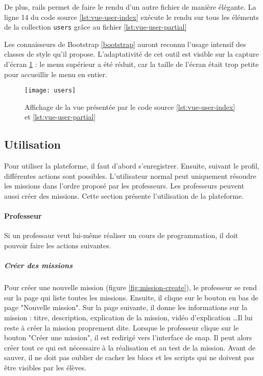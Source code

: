 \begin{figure}

\end{figure}
De plus, \gls{rails} permet de faire le rendu d'un autre fichier de manière élégante. La ligne 14 du code source \ref{lst:vue-user-index} exécute le rendu sur tous les éléments de la collection \texttt{users} grâce au fichier \ref{lst:vue-user-partial}

Les connaisseurs de Bootstrap \ref{bootstrap} auront reconnu l'usage intensif des classes de style qu'il propose. L'adaptativité de cet outil est visible sur la capture d'écran \ref{fig:vue-users} : le menu supérieur a été réduit, car la taille de l'écran était trop petite pour accueillir le menu en entier.

\begin{figure}
  \begin{center}
    \texttt{[image: users]}
    \caption{Affichage de la vue présentée par le code source \ref{lst:vue-user-index} et \ref{lst:vue-user-partial}}
    \label{fig:vue-users}
  \end{center}
\end{figure}

\subsection{Utilisation}
Pour utiliser la plateforme, il faut d'abord s'enregistrer. Ensuite, suivant le profil, différentes actions sont possibles. L'utilisateur normal peut uniquement résoudre les \glspl{mission} dans l'ordre proposé par les professeurs. Les professeurs peuvent aussi créer des \glspl{mission}. Cette section présente l'utilisation de la plateforme.

\paragraph{Professeur}
Si un professaur veut lui-même réaliser un cours de programmation, il doit pouvoir faire les actions suivantes.

\subparagraph{Créer des missions} Pour créer une nouvelle \gls{mission} (figure \ref{fig:mission-create}), le professeur se rend sur la page qui liste toutes les \glspl{mission}. Ensuite, il clique sur le bouton en bas de page "Nouvelle mission". Sur la page suivante, il donne les informations sur la \gls{mission} : titre, description, explication de la mission, vidéo d'explication \ldots Il lui reste à créer la mission proprement dite. Lorsque le professeur clique sur le bouton "Créer une \gls{mission}", il est redirigé vers l'interface de \gls{snap}. Il peut alors créer tout ce qui est nécessaire à la réalisation et au test de la mission. Avant de sauver, il ne doit pas oublier de cacher les \glspl{bloc} et les \glspl{script} qui ne doivent pas être visibles par les élèves.

